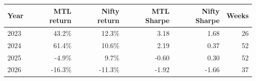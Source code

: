 \begin{tabular}{lrrrrr}
\toprule
Year & MTL return & Nifty return & MTL Sharpe & Nifty Sharpe & Weeks \\
\midrule
2023 & 43.2\% & 12.3\% & 3.18 & 1.68 & 26 \\
2024 & 61.4\% & 10.6\% & 2.19 & 0.37 & 52 \\
2025 & -4.9\% & 9.7\% & -0.60 & 0.30 & 52 \\
2026 & -16.3\% & -11.3\% & -1.92 & -1.66 & 37 \\
\bottomrule
\end{tabular}
